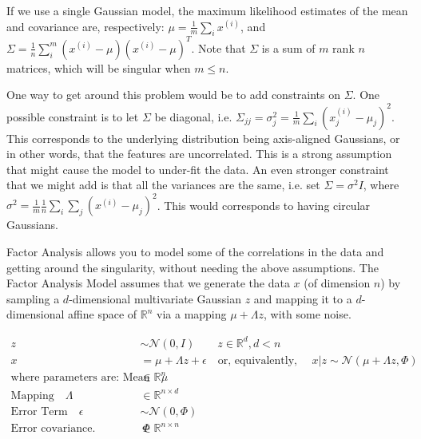 \documentclass[letterpaper,10pt]{article}
\begin{document}
If we use a single Gaussian model, the maximum likelihood estimates of the mean and covariance are, respectively: $\mu = \frac{1}{m} \sum_i x^{(i)}$, and $\Sigma = \frac{1}{n} \sum_i^{m} (x^{(i)} - \mu) (x^{(i)} - \mu)^T$. Note that $\Sigma$ is a sum of $m$ rank $n$ matrices, which will be singular when $m \leq n$.

One way to get around this problem would be to add constraints on $\Sigma$. One possible constraint is to let $\Sigma$ be diagonal, i.e. $\Sigma_{jj} = \sigma_j^2 = \frac{1}{m} \sum_i (x_j^{(i)} - \mu_j)^2$. This corresponds to the underlying distribution being axis-aligned Gaussians, or in other words, that the features are uncorrelated. This is a strong assumption that might cause the model to under-fit the data. An even stronger constraint that we might add is that all the variances are the same, i.e. set $\Sigma = \sigma^2 I$, where $\sigma^2 = \frac{1}{m} \frac{1}{n} \sum_i \sum_j (x^{(i)} - \mu_j)^2$. This would corresponds to having circular Gaussians.

Factor Analysis allows you to model some of the correlations in the data and getting around the singularity, without needing the above assumptions. The Factor Analysis Model assumes that we generate the data $x$ (of dimension $n$) by sampling a $d$-dimensional multivariate Gaussian $z$ and mapping it to a $d$-dimensional affine space of $\mathbb{R}^n$ via a mapping $\mu + \Lambda z$, with some noise.

\begin{align}
z &\sim \mathscr{N}(0,I) \qquad z \in \mathbb{R}^d, d<n \\
x &= \mu + \Lambda z + \epsilon \quad \text{or, equivalently, } \quad x|z \sim \mathscr{N}(\mu + \Lambda z, \Phi)\\
\text{where parameters are: } \text{Mean} \quad \mu &\in \mathbb{R}^n \\
\text{Mapping} \quad  \Lambda &\in \mathbb{R}^{n \times d} \\
\text{Error Term}  \quad  \epsilon &\sim \mathscr{N}(0,\Phi) \\
\text{Error covariance. Assumed diagonal.} \quad \Phi &\in \mathbb{R}^{n \times n} 
\end{align}
\end{document}
